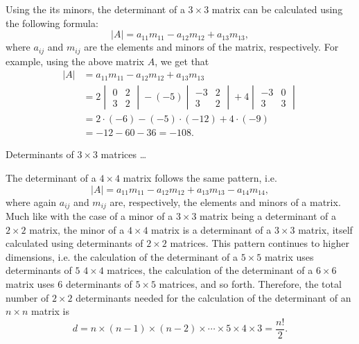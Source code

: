 Using the its minors, the determinant of a $3\times3$ matrix can be calculated using the following formula:
\begin{equation}
	|A| = a_{11}m_{11} - a_{12}m_{12} + a_{13}m_{13},
	\label{eq:determinant_3x3}
\end{equation}
where $a_{ij}$ and $m_{ij}$ are the elements and minors of the matrix, respectively. For example, using the above matrix $A$, we get that
\begin{align*}
	|A| &= a_{11}m_{11} - a_{12}m_{12} + a_{13}m_{13}\\
		&= 2\begin{vmatrix}0&2\\3&2\end{vmatrix} - (-5)\begin{vmatrix}-3&2\\3&2\end{vmatrix} + 4\begin{vmatrix}-3&0\\3&3\end{vmatrix}\\
		&= 2\cdot(-6) - (-5)\cdot(-12) + 4\cdot(-9)\\
		&= -12 - 60 - 36 = -108.
\end{align*}

\begin{example}{Determinants of $3\times3$ matrices}{}
	\ldots
\end{example}

The determinant of a $4\times4$ matrix follows the same pattern, i.e.
\begin{equation}
	|A| = a_{11}m_{11} - a_{12}m_{12} + a_{13}m_{13} - a_{14}m_{14},
	\label{eq:}
\end{equation}
where again $a_{ij}$ and $m_{ij}$ are, respectively, the elements and minors of a matrix. Much like with the case of a minor of a $3\times3$ matrix being a determinant of a $2\times2$ matrix, the minor of a $4\times4$ matrix is a determinant of a $3\times3$ matrix, itself calculated using determinants of $2\times2$ matrices. This pattern continues to higher dimensions, i.e. the calculation of the determinant of a $5\times5$ matrix uses determinants of $5$ $4\times4$ matrices, the calculation of the determinant of a $6\times6$ matrix uses $6$ determinants of $5\times5$ matrices, and so forth. Therefore, the total number of $2\times2$ determinants needed for the calculation of the determinant of an $n\times n$ matrix is
\begin{equation}
	d = n\times(n-1)\times(n-2)\times\cdots\times5\times4\times3 = \frac{n!}{2}.
	\label{eq:num_of_2x2_dets_in_n_dim_matrix}
\end{equation}

